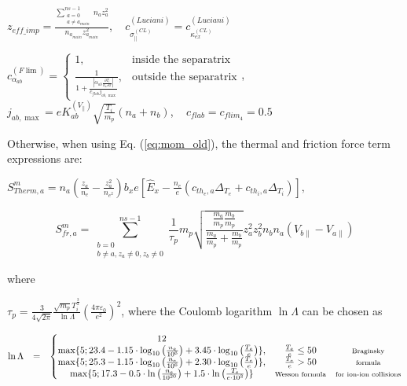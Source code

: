 \documentclass[a4paper,10pt]{report}
\begin{document}
$z_{eff\_imp} = \frac{\sum \limits_{\substack{a=0 \\ a \ne a_{main}}}^{ns - 1} n_a z_a^2}{n_{a_{main}} z_{a_{main}}^2}$, ~ $c_{\sigma^{(CL)}_{\parallel}}^{(Luciani)} = c_{\kappa_{ex}^{(CL)}}^{(Luciani)}$

$c_{\alpha_{ab}}^{(F \lim)} = \left\{
\begin{matrix}
1, & \mbox{inside the separatrix} \\
\frac{1}{1+\frac{\left| \alpha_{ab} \frac{\partial T_i}{h_x \partial x} \right|}{c_{flab} j_{ab, \max}}}, & \mbox{outside the separatrix}
\end{matrix}
\right.
$, ~ $j_{ab, \max} = e K_{ab}^{(V_\parallel)} \sqrt{\frac{T_i}{m_p}} \left( n_a + n_b \right)$, ~ $c_{flab} = c_{flim_4} = 0.5$

Otherwise, when using Eq. (\ref{eq:mom_old}), the thermal and friction force term expressions are:
 
$S_{Therm,a}^m =
n_a \left(
	\frac{z_a}{n_e} - \frac{z_a^2}{n_{e^2}}
\right)
b_x e
\left[
	\hat E_x - \frac{n_e}{e} \left(
		c_{th_e,a} \Delta_{T_e} + c_{th_i,a} \Delta_{T_i}
	\right)
\right],$

\begin{equation}
S^m_{fr,a} =
\sum \limits^{ns-1}_{\substack{b = 0 \\ b\neq a, z_a \neq 0, z_b \neq 0}} \frac 1{\tau_p} m_p
\sqrt{ \frac {\frac{m_a}{m_p} \frac{m_b}{m_p}} {\frac{m_a}{m_p} + \frac{m_b}{m_p}} }
z_a^2 z_b^2 n_b n_a \left( V_{b \parallel} - V_{a \parallel} \right)
\end{equation}

where

$\tau_p = \frac 3{4\sqrt{2\pi}}
\frac{\sqrt{m_p}T_i^{\frac 3 2}}{\ln \Lambda}
\left(\frac{4 \pi \varepsilon_0}{e^2}\right)^2$, where the Coulomb logarithm $\ln \Lambda $ can be chosen as

\begin{equation}
\begin{matrix}
\ln \Lambda & =
& \left\{
\begin{matrix}
12 \\
\max \{ 5; 23.4 - 1.15 \cdot \log_{10} \left( \frac{n_e}{10^6} \right) + 3.45 \cdot \log_{10} \left( \frac{T_e}e \right)  \}, & \frac{T_e}{e} \leq 50 & \mbox{\scriptsize{Braginsky}} \\
\max \{ 5; 25.3 - 1.15 \cdot \log_{10} \left( \frac{n_e}{10^6} \right) + 2.30 \cdot \log_{10} \left( \frac{T_e}e \right)  \}, & \frac{T_e}{e} > 50 &  \mbox{\scriptsize{formula}}\\
\max \{ 5; 17.3 - 0.5 \cdot \ln \left( \frac{n_e}{10^{20}} \right) + 1.5 \cdot \ln \left( \frac{T_e}{e \cdot 10^3} \right)  \} & \mbox{\scriptsize{Wesson formula}} &\mbox{\scriptsize{for ion-ion collisions}}\\
\end{matrix} \right.
\end{matrix}
\end{equation}
\end{document}
